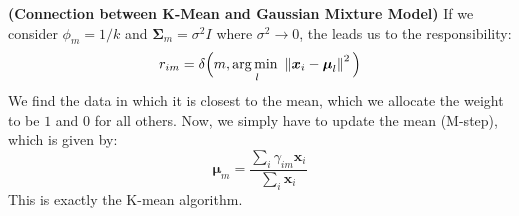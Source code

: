 \begin{remark}{\textbf{(Connection between K-Mean and Gaussian Mixture Model)}}
    If we consider $\phi_m = 1/k$ and $\boldsymbol \Sigma_m = \sigma^2I$ where $\sigma^2\rightarrow0$, the leads us to the responsibility:
    \begin{equation*}
        r_{im} = \delta\Big( m, \underset{l}{\arg\min \ } \left\lVert\boldsymbol x_i - \boldsymbol \mu_l\right\rVert^2 \Big)
    \end{equation*}
    We find the data in which it is closest to the mean, which we allocate the weight to be $1$ and $0$ for all others. Now, we simply have to update the mean (M-step), which is given by:
    \begin{equation*}
        \boldsymbol \mu_m = \frac{\sum_i \gamma_{im}\boldsymbol x_i}{\sum_i \boldsymbol x_i}
    \end{equation*}
    This is exactly the K-mean algorithm. 
\end{remark}

